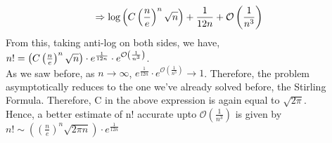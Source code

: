 \documentclass[letterpaper]{exam}
\begin{document}
\begin{questions}
\begin{parts}
\begin{solution}
\begin{align*}
    &\Rightarrow 
    \text{log}\left(\huge{C}\left(\frac{n}{e}\right)^{n}\sqrt{n} \right) + \frac{1}{12n} + \mathcal{O}\left(\frac{1}{n^3}\right)
\end{align*}
From this, taking anti-log on both sides, we have, $n! = \left(\huge{C}\left(\frac{n}{e}\right)^{n}\sqrt{n} \right)\cdot e^{\frac{1}{12n}}\cdot e^{\mathcal{O}\left(\frac{1}{n^3}\right)}$.\\
As we saw before, as $n \rightarrow \infty$, $e^{\frac{1}{12n}}\cdot e^{\mathcal{O}\left(\frac{1}{n^3}\right)} \rightarrow 1$. Therefore, the problem asymptotically reduces to the one we've already solved before, the Stirling Formula. Therefore, C in the above expression is again equal to $\sqrt{2\pi}$.\\
Hence, a better estimate of n! accurate upto $\mathcal{O}\left(\frac{1}{n^3}\right)$ is given by $n! \sim \left(\left(\frac{n}{e}\right)^{n}\sqrt{2 \pi n} \right)\cdot e^{\frac{1}{12n}} $
\end{solution}
\end{parts}
\end{questions}
\end{document}
